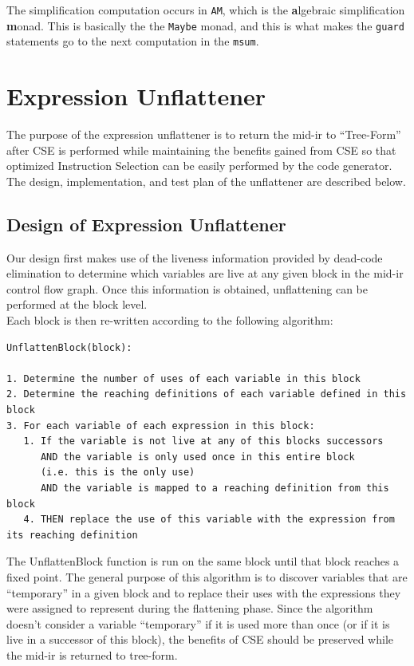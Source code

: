 \documentclass[11pt]{article}
\begin{document}
The simplification computation occurs in \texttt{AM}, which is the
\textbf{a}lgebraic simplification \textbf{m}onad.  This is basically
the the \texttt{Maybe} monad, and this is what makes the
\texttt{guard} statements go to the next computation in the
\texttt{msum}.

\section {Expression Unflattener}
\label{sec:unflat}

The purpose of the expression unflattener is to return the mid-ir to
``Tree-Form'' after CSE is performed while maintaining the benefits
gained from CSE so that optimized Instruction Selection can be easily
performed by the code generator. The design, implementation, and test
plan of the unflattener are described below.

\subsection{Design of Expression Unflattener}

Our design first makes use of the liveness information
provided by dead-code elimination to determine which variables are
live at any given block in the mid-ir control flow graph. Once this
information is obtained, unflattening can be performed at the block
level.\\


\noindent Each block is then re-written according to the following algorithm: 

\begin{verbatim}
UnflattenBlock(block):

1. Determine the number of uses of each variable in this block 
2. Determine the reaching definitions of each variable defined in this
block
3. For each variable of each expression in this block: 
   1. If the variable is not live at any of this blocks successors 
      AND the variable is only used once in this entire block 
      (i.e. this is the only use)
      AND the variable is mapped to a reaching definition from this block 
   4. THEN replace the use of this variable with the expression from
its reaching definition
\end{verbatim}

\noindent The UnflattenBlock function is run on the same block until that block
reaches a fixed point. The general purpose of this algorithm is to
discover variables that are ``temporary'' in a given block and to replace
their uses with the expressions they were assigned to represent during
the flattening phase. Since the algorithm doesn't consider a variable
``temporary'' if it is used more than once (or if it is live in a
successor of this block), the benefits of CSE should be preserved
while the mid-ir is returned to tree-form. 
\end{document}
